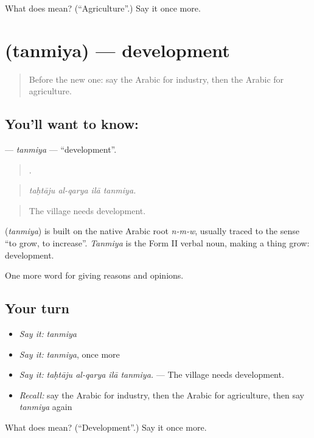 \begin{tcolorbox}[breakable,colback=teal!4,colframe=teal!35!black,title={Before you move on}]
What does  mean? (\textquotedblleft{}Agriculture\textquotedblright{}.) Say it once more.
\end{tcolorbox}
\section[\texorpdfstring{\ar{تنمية} (tanmiya)}{تنمية (tanmiya)}]{ (tanmiya) — development}

\label{lesson:AR-C384-tanmiya}



\begin{quote}
Before the new one: say the Arabic for industry, then the Arabic for agriculture.
\end{quote}

\subsection*{You'll want to know: }
\textbf{} — \emph{tanmiya} — \textquotedblleft{}development\textquotedblright{}.

\begin{quote}
   .
\end{quote}

\begin{quote}
\emph{taḥtāju al-qarya ilā tanmiya.}
\end{quote}

\begin{quote}
The village needs development.
\end{quote}

\begin{cousinweb}
\textbf{} (\emph{tanmiya}) is built on the native Arabic root \emph{n-m-w}, usually traced to the sense \textquotedblleft{}to grow, to increase\textquotedblright{}. \emph{Tanmiya} is the Form II verbal noun, making a thing grow: development.
\end{cousinweb}

\begin{grammarlens}[title={What you've built}]
One more word for giving reasons and opinions.
\end{grammarlens}

\subsection*{Your turn}
\begin{itemize}
\raggedright
  \item \emph{Say it:} \emph{tanmiya}
  \item \emph{Say it:} \emph{tanmiya}, once more
  \item \emph{Say it:} \emph{taḥtāju al-qarya ilā tanmiya.} — The village needs development.
  \item \emph{Recall:} say the Arabic for industry, then the Arabic for agriculture, then say \emph{tanmiya} again
\end{itemize}

\begin{tcolorbox}[breakable,colback=teal!4,colframe=teal!35!black,title={Before you move on}]
What does  mean? (\textquotedblleft{}Development\textquotedblright{}.) Say it once more.
\end{tcolorbox}
